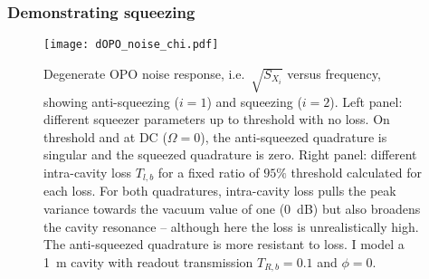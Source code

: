 
\subsubsection{Demonstrating squeezing}

\begin{figure}
	\centering
	\texttt{[image: dOPO\_noise\_chi.pdf]}
	\caption{Degenerate OPO noise response, i.e.\ $\sqrt{S_{X_i}}$ versus frequency, showing anti-squeezing ($i=1$) and squeezing ($i=2$). Left panel: different squeezer parameters up to threshold with no loss. On threshold and at DC ($\Omega=0$), the anti-squeezed quadrature is singular and the squeezed quadrature is zero. Right panel: different intra-cavity loss $T_{l,b}$ for a fixed ratio of $95\%$ threshold calculated for each loss. For both quadratures, intra-cavity loss pulls the peak variance towards the vacuum value of one (0~dB) but also broadens the cavity resonance -- although here the loss is unrealistically high. The anti-squeezed quadrature is more resistant to loss. I model a 1~m cavity with readout transmission $T_{R,b}=0.1$ and $\phi=0$.}
	\label{fig:dOPO_variances}
\end{figure}

